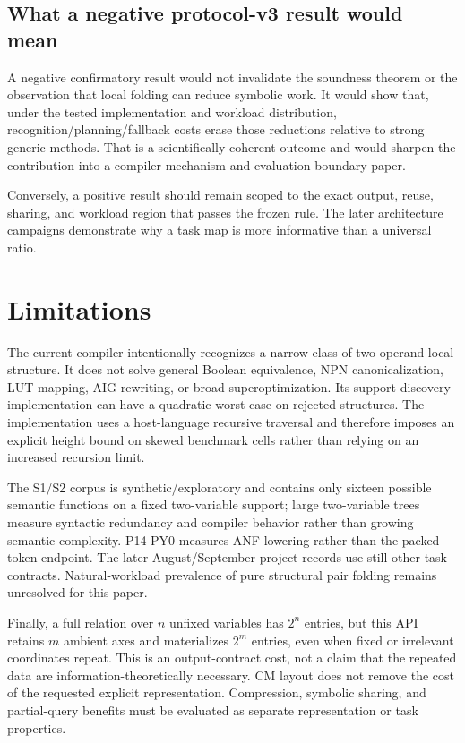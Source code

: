 \documentclass[10pt]{article}
\theoremstyle{plain}
\theoremstyle{definition}
\theoremstyle{remark}
\begin{document}
\subsection{What a negative protocol-v3 result would mean}

A negative confirmatory result would not invalidate the soundness theorem or the observation that local folding can reduce symbolic work. It would show that, under the tested implementation and workload distribution, recognition/planning/fallback costs erase those reductions relative to strong generic methods. That is a scientifically coherent outcome and would sharpen the contribution into a compiler-mechanism and evaluation-boundary paper.

Conversely, a positive result should remain scoped to the exact output, reuse, sharing, and workload region that passes the frozen rule. The later architecture campaigns demonstrate why a task map is more informative than a universal ratio.

\section{Limitations}

The current compiler intentionally recognizes a narrow class of two-operand local structure. It does not solve general Boolean equivalence, NPN canonicalization, LUT mapping, AIG rewriting, or broad superoptimization. Its support-discovery implementation can have a quadratic worst case on rejected structures. The implementation uses a host-language recursive traversal and therefore imposes an explicit height bound on skewed benchmark cells rather than relying on an increased recursion limit.

The S1/S2 corpus is synthetic/exploratory and contains only sixteen possible semantic functions on a fixed two-variable support; large two-variable trees measure syntactic redundancy and compiler behavior rather than growing semantic complexity. P14-PY0 measures ANF lowering rather than the packed-token endpoint. The later August/September project records use still other task contracts. Natural-workload prevalence of pure structural pair folding remains unresolved for this paper.

Finally, a full relation over $n$ unfixed variables has $2^n$ entries, but this API retains $m$ ambient axes and materializes $2^m$ entries, even when fixed or irrelevant coordinates repeat. This is an output-contract cost, not a claim that the repeated data are information-theoretically necessary. CM layout does not remove the cost of the requested explicit representation. Compression, symbolic sharing, and partial-query benefits must be evaluated as separate representation or task properties.
\end{document}
